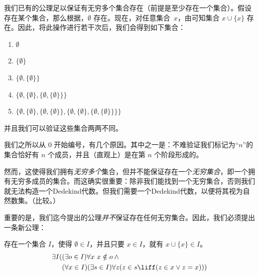 \documentclass[../../../include/open-logic-section]{subfiles}
\begin{document}

我们已有的公理足以保证有无穷多个集合存在（前提是至少存在一个集合）。假设存在某个集合，那么根据，$\emptyset$ 存在。现在，对任意集合~$x$，由可知集合 $x \cup \{x\}$ 存在。因此，将此操作进行若干次后，我们会得到如下集合：

\begin{enumerate}
	\item[0.] $\emptyset$ %
	\item[1.] $ \{\emptyset\}$ %
	\item[2.] $\{\emptyset, \{\emptyset\}\}$ %
	\item[3.] $\{\emptyset, \{\emptyset\}, \{\emptyset, \{\emptyset\}\}\}$ %
	\item[4.] $\{\emptyset, \{\emptyset\}, \{\emptyset, \{\emptyset\}\}, \{\emptyset, \{\emptyset\}, \{\emptyset, \{\emptyset\}\}\}\}$%
\end{enumerate}

并且我们可以验证这些集合两两不同。

我们之所以从 $0$ 开始编号，有几个原因。其中之一是：不难验证我们标记为“$n$”的集合恰好有 $n$ 个成员，并且（直观上）是在第 $n$ 个阶段形成的。

然而，这使得我们拥有\emph{无穷多个}集合，但并不能保证存在一个\emph{无穷集合}，即一个拥有无穷多成员的集合。而这确实很重要：除非我们能找到一个无穷集合，否则我们就无法构造一个Dedekind代数。但我们需要一个Dedekind代数，以便将其视为自然数集。（比较。）

重要的是，我们迄今提出的公理\emph{并不}保证存在任何无穷集合。因此，我们必须提出一条新公理：

\begin{axiom}[无穷公理]
存在一个集合 $I$，使得 $\emptyset \in I$，并且只要 $x \in I$，就有 $x \cup \{x\} \in I$。
\begin{align*}
	\exists I( & (\exists o \in I)\forall x\ x \notin o \land {}\\
	& (\forall x \in I)(\exists s \in I)\forall z(z \in s \liff (z \in x \lor z = x)))
\end{align*}
\end{axiom}
\end{document}
